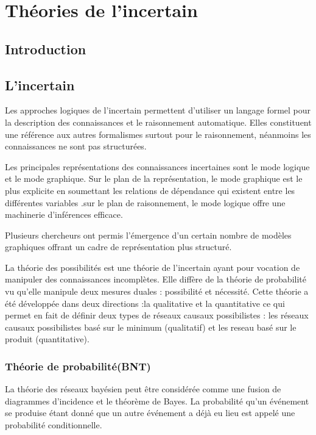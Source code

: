 \chapter{Théories de l'incertain}

{}
\section*{Introduction}



\section{L’incertain}

Les approches logiques de l’incertain permettent d’utiliser un langage formel pour la description des connaissances et le raisonnement automatique. Elles constituent une référence aux autres formalismes surtout pour le raisonnement, néanmoins les connaissances ne  sont pas structurées.

Les principales représentations des connaissances incertaines sont le mode logique et le mode graphique.
Sur le plan de la représentation, le mode graphique est le plus explicite en soumettant les relations de dépendance qui existent entre les différentes variables .sur le plan de raisonnement, le mode logique offre une machinerie d’inférences efficace.

Plusieurs chercheurs ont permis l’émergence d’un certain nombre de modèles graphiques offrant un cadre de représentation plus structuré.

La théorie des possibilités est une théorie de l’incertain ayant pour vocation de manipuler des connaissances incomplètes. Elle diffère de la théorie de probabilité  vu qu'elle manipule deux mesures duales : possibilité et nécessité. Cette théorie a été développée dans deux directions :la qualitative et la quantitative ce qui permet en fait de définir deux types de réseaux causaux possibilistes : les réseaux causaux possibilistes basé sur le minimum (qualitatif) et les reseau basé sur le produit (quantitative).



\subsection{Théorie de probabilité(BNT)}

La théorie des réseaux bayésien peut être considérée comme une fusion de diagrammes d'incidence et le théorème de Bayes. La probabilité qu'un événement se produise étant donné que un autre événement a déjà eu lieu est appelé une probabilité conditionnelle. 

